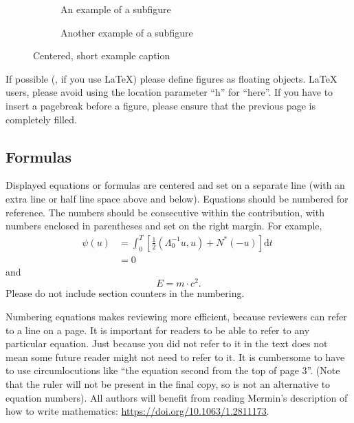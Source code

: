\documentclass[runningheads]{llncs}
\begin{document}
\begin{figure}[tb]
  \centering
  \begin{subfigure}{0.68\linewidth}
    \fbox{\rule{0pt}{0.5in} \rule{.9\linewidth}{0pt}}
    \caption{An example of a subfigure}
    \label{fig:short-a}
  \end{subfigure}
  \hfill
  \begin{subfigure}{0.28\linewidth}
    \fbox{\rule{0pt}{0.5in} \rule{.9\linewidth}{0pt}}
    \caption{Another example of a subfigure}
    \label{fig:short-b}
  \end{subfigure}
  \caption{Centered, short example caption}
  \label{fig:short}
\end{figure}

If possible (\eg, if you use \LaTeX) please define figures as floating objects. 
\LaTeX{} users, please avoid using the location parameter ``h'' for ``here''. 
If you have to insert a pagebreak before a figure, please ensure that the previous page is completely filled.


\subsection{Formulas}
Displayed equations or formulas are centered and set on a separate line (with an extra line or half line space above and below). 
Equations should be numbered for reference. 
The numbers should be consecutive within the contribution, with numbers enclosed in parentheses and set on the right margin.
For example,
\begin{align}
  \psi (u) & = \int_{0}^{T} \left[\frac{1}{2}
  \left(\Lambda_{0}^{-1} u,u\right) + N^{\ast} (-u)\right] \text{d}t \; \\
& = 0
\end{align}
and 
\begin{equation}
  E = m\cdot c^2.
  \label{eq:important}
\end{equation}
Please do not include section counters in the numbering.

Numbering equations makes reviewing more efficient, because reviewers can refer to a line on a page.  
It is important for readers to be able to refer to any particular equation.
Just because you did not refer to it in the text does not mean some future reader might not need to refer to it.
It is cumbersome to have to use circumlocutions like ``the equation second from the top of page 3''.
(Note that the ruler will not be present in the final copy, so is not an alternative to equation numbers).
All authors will benefit from reading Mermin's description of how to write mathematics:
\url{https://doi.org/10.1063/1.2811173}.
\end{document}
